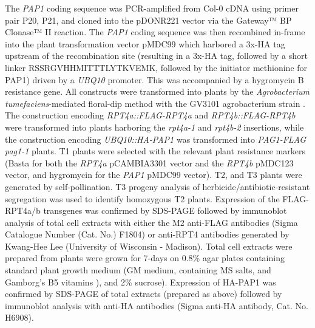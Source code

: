 The \textit{PAP1} coding sequence was PCR-amplified from Col-0 cDNA using primer pair P20, P21, and cloned into the pDONR221 vector via the Gateway™ BP Clonase™ II reaction. The \textit{PAP1} coding sequence was then recombined in-frame into the plant transformation vector pMDC99 which harbored a 3x-HA tag upstream of the recombination site (resulting in a 3x-HA tag, followed by a short linker RSSRGVHHMITTTLYTKVEMK, followed by the initiator methionine for PAP1) driven by a \textit{UBQ10} promoter. This was accompanied by a hygromycin B resistance gene. All constructs were transformed into plants by the \textit{Agrobacterium tumefaciens}-mediated floral-dip method with the GV3101 agrobacterium strain \citep{clough98, gelvin03, zhang06}. The construction encoding \textit{RPT4a::FLAG-RPT4a} and \textit{RPT4b::FLAG-RPT4b} were transformed into plants harboring the \textit{rpt4a-1} and \textit{rpt4b-2} insertions, while the construction encoding \textit{UBQ10::HA-PAP1} was transformed into \textit{PAG1-FLAG pag1-1} plants. T1 plants were selected with the relevant plant resistance markers (Basta for both the \textit{RPT4a} pCAMBIA3301 vector and the \textit{RPT4b} pMDC123 vector, and hygromycin for the \textit{PAP1} pMDC99 vector). T2, and T3 plants were generated by self-pollination. T3 progeny analysis of herbicide/antibiotic-resistant segregation was used to identify homozygous T2 plants. Expression of the FLAG-RPT4a/b transgenes was confirmed by SDS-PAGE followed by immunoblot analysis of total cell extracts with either the M2 anti-FLAG antibodies (Sigma Catalogue Number (Cat. No.) F1804) or anti-RPT4 antibodies generated by Kwang-Hee Lee (University of Wisconsin - Madison). Total cell extracts were prepared from plants were grown for 7-days on 0.8\% agar plates containing standard plant growth medium (GM medium, containing MS salts, and Gamborg's B5 vitamins \citep{gamborg68, julio06, murashige62}), and 2\% sucrose). Expression of HA-PAP1 was confirmed by SDS-PAGE of total extracts (prepared as above) followed by immunoblot analysis with anti-HA antibodies (Sigma anti-HA antibody, Cat. No. H6908).

